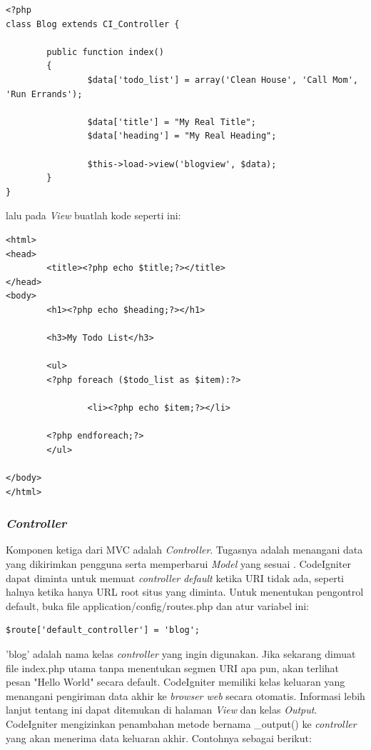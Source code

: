     \begin{lstlisting}[basicstyle=\ttfamily, frame=single,
        columns=fullflexible, breaklines=true, numbers=none]
<?php
class Blog extends CI_Controller {

        public function index()
        {
                $data['todo_list'] = array('Clean House', 'Call Mom', 'Run Errands');

                $data['title'] = "My Real Title";
                $data['heading'] = "My Real Heading";

                $this->load->view('blogview', $data);
        }
}
    \end{lstlisting}  
    lalu pada \textit{View} buatlah kode seperti ini:
     \begin{lstlisting}[basicstyle=\ttfamily, frame=single,
        columns=fullflexible, breaklines=true, numbers=none]
<html>
<head>
        <title><?php echo $title;?></title>
</head>
<body>
        <h1><?php echo $heading;?></h1>

        <h3>My Todo List</h3>

        <ul>
        <?php foreach ($todo_list as $item):?>

                <li><?php echo $item;?></li>

        <?php endforeach;?>
        </ul>

</body>
</html>
    \end{lstlisting}    
    
\subsubsection{\textit{Controller}}
\label{sec:Controller} 
Komponen ketiga dari MVC adalah \textit{Controller}. Tugasnya adalah menangani data yang dikirimkan pengguna serta memperbarui \textit{Model} yang sesuai \cite{codeigniter}. CodeIgniter dapat diminta untuk memuat \textit{controller} \textit{default} ketika URI tidak ada, seperti halnya ketika hanya URL root situs yang diminta. Untuk menentukan pengontrol default, buka file application/config/routes.php dan atur variabel ini:

     \begin{lstlisting}[basicstyle=\ttfamily, frame=single,
        columns=fullflexible, breaklines=true, numbers=none]
$route['default_controller'] = 'blog';
    \end{lstlisting} 

'blog' adalah nama kelas \textit{controller} yang ingin digunakan. Jika sekarang dimuat file index.php utama tanpa menentukan segmen URI apa pun, akan terlihat pesan "Hello World" secara default. CodeIgniter memiliki kelas keluaran yang menangani pengiriman data akhir ke \textit{browser web} secara otomatis. Informasi lebih lanjut tentang ini dapat ditemukan di halaman \textit{View} dan kelas \textit{Output}. CodeIgniter mengizinkan penambahan metode bernama \_output() ke \textit{controller} yang akan menerima data keluaran akhir. Contohnya sebagai berikut: 

